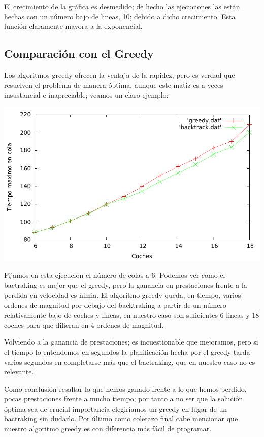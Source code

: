 \documentclass[a4paper, 11pt]{article}
\begin{document}
El crecimiento de la gráfica es desmedido; de hecho las ejecuciones las están hechas con un número bajo de lineas, 10; debido a dicho crecimiento. Esta función claramente mayora a la exponencial.
\newpage
\subsection{Comparación con el Greedy}

Los algoritmos greedy ofrecen la ventaja de la rapidez, pero es verdad que resuelven el problema de manera óptima, aunque este matiz es a veces insustancial e inapreciable; veamos un claro ejemplo:

\begin{center}
	\includegraphics{./img/comp}
\end{center}

Fijamos en esta ejecución el número de colas a 6. Podemos ver como el bactraking es mejor que el greedy, pero la ganancia en prestaciones frente a la perdida en velocidad es nimia. El algoritmo greedy queda, en tiempo, varios ordenes de magnitud por debajo del backtraking a partir de un número relativamente bajo de coches y lineas, en nuestro caso son suficientes 6 lineas y 18 coches para que difieran en 4 ordenes de magnitud.

Volviendo a la ganancia de prestaciones; es incuestionable que mejoramos, pero si el tiempo lo entendemos en segundos la planificación hecha por el greedy tarda varios segundos en completarse más que el bactraking, que en nuestro caso no es relevante.

Como conclusión resaltar lo que hemos ganado frente a lo que hemos perdido, pocas prestaciones frente a mucho tiempo; por tanto a no ser que la solución óptima sea de crucial importancia elegiríamos un greedy en lugar de un bactraking sin dudarlo. Por último como coletazo final cabe mencionar que nuestro algoritmo greedy es con diferencia más fácil de programar.  





\end{document}
